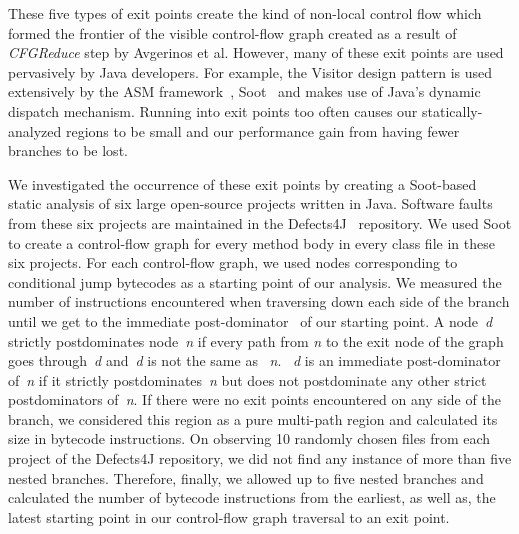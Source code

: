 These five types of exit points create the kind of non-local control flow which formed the frontier of the visible control-flow graph created as a result of \textit{CFGReduce} step by Avgerinos et al.
%
However, many of these exit points are used pervasively by Java developers.
%
For example, the Visitor design pattern is used extensively by the ASM framework~\cite{asm}, Soot~\cite{soot} and makes use of Java\rq s dynamic dispatch mechanism.
%
Running into exit points too often causes our statically-analyzed regions to be small and our performance gain from having fewer branches to be lost.

We investigated the occurrence of these exit points by creating a Soot-based static analysis of six large open-source projects written in Java.
%
Software faults from these six projects are maintained in the Defects4J~\cite{defects4j} repository.
%
We used Soot to create a control-flow graph for every method body in every class file in these six projects.
%
For each control-flow graph, we used nodes corresponding to conditional jump bytecodes as a starting point of our analysis.
%
We measured the number of instructions encountered when traversing down
each side of the branch until we get to the immediate post-dominator~\cite{dragon-book} of our starting point.
%
A node~\textit{d} strictly postdominates node~\textit{n} if every path from
\textit{n} to the exit node of the graph goes through~\textit{d}
and~\textit{d} is not the same as ~\textit{n}.
%
~\textit{d} is an immediate post-dominator of~\textit{n} if
it strictly postdominates~\textit{n} but does not postdominate any other
strict postdominators of~\textit{n}.
%
If there were no exit points encountered on any side of the branch, we considered this region as a pure multi-path region and calculated its size in bytecode instructions.
%
On observing 10 randomly chosen files from each project of the Defects4J repository, we did not find any instance of more than five nested branches. 
%
Therefore, finally, we allowed up to five nested branches and calculated the number of bytecode instructions from the earliest, as well as, the latest starting point in our control-flow graph traversal to an exit point.
%

